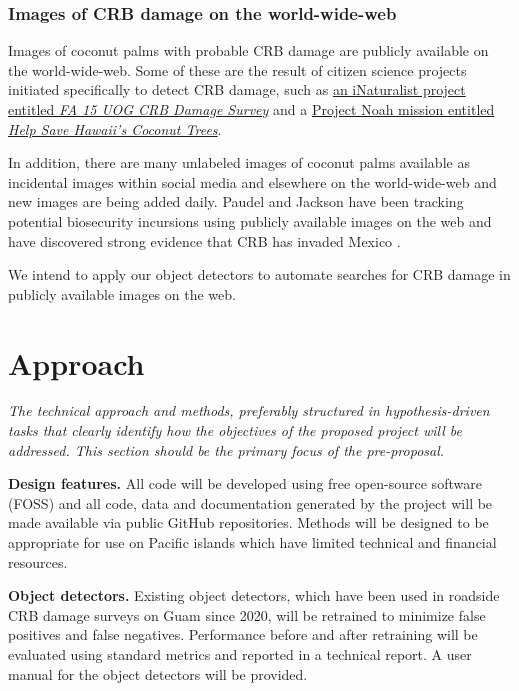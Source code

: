 \documentclass[11pt,english,letterpaper]{scrartcl}
\begin{document}
\subsubsection{Images of CRB damage on the world-wide-web}

Images of coconut palms with probable CRB damage are publicly available on the world-wide-web. Some of these are the result of citizen science projects initiated specifically to detect CRB damage, such as \href{https://www.inaturalist.org/projects/retired-fa-15-uog-crb-damage-survey}{an iNaturalist project entitled \textit{FA 15 UOG CRB Damage Survey}} and a \href{https://www.projectnoah.org/missions/182566002}{Project Noah mission entitled \textit{Help Save Hawaii's Coconut Trees}}.

In addition, there are many unlabeled images of coconut palms available as incidental images within social media and elsewhere on the world-wide-web and new images are being added daily. Paudel and Jackson have been tracking potential biosecurity incursions using publicly available images on the web \cite{Paudel2023} and have discovered strong evidence that CRB has invaded Mexico \cite{Jackson2022}.

We intend to apply our object detectors to automate searches for CRB damage in publicly available images on the web. 

\section{Approach}

\textit{The technical approach and methods, preferably structured in hypothesis-driven tasks that clearly identify how the objectives of the proposed project will be addressed. This section should be the primary focus of the pre-proposal.}

\textbf{Design features.} All code will be developed using free open-source software (FOSS) and all code, data and documentation generated by the project will be made available via public GitHub repositories. Methods will be designed to be appropriate for use on Pacific islands which have  limited technical and financial resources.

\textbf{Object detectors.} Existing object detectors, which have been used in roadside CRB damage surveys on Guam since 2020, will be retrained to minimize false positives and false negatives. Performance before and after retraining will be evaluated using standard metrics and reported in a technical report. A user manual for the object detectors will be provided.
\end{document}
